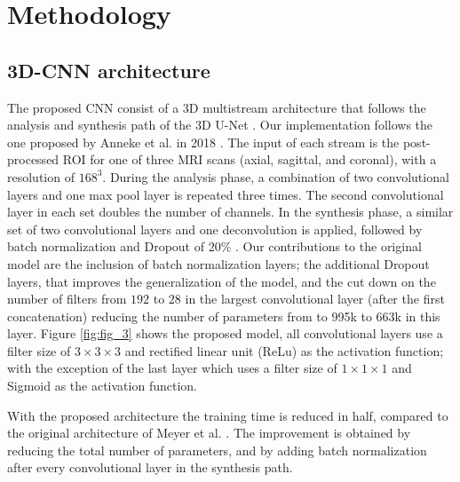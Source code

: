 \section{Methodology}
\label{sec:methods}




\subsection{3D-CNN architecture}
The proposed CNN consist of a 3D multistream architecture that follows the analysis and synthesis path of the 3D U-Net \cite{cciccek20163d}. Our implementation follows the one proposed by Anneke et al. in 2018  \cite{anneke}. The input of each stream is the post-processed ROI for one of three MRI scans (axial, sagittal, and coronal), with a resolution of $168^3$. During the analysis phase, a combination of two convolutional layers and one max pool layer is repeated three times. The second convolutional layer in each set doubles the number of channels.  In the synthesis phase, a similar set of two convolutional layers and one deconvolution is applied, followed by batch normalization and Dropout of 20\% \cite{hinton2012improving}. Our contributions
to the original model are the inclusion of batch normalization layers; the additional Dropout layers, that improves the generalization of the model, and the cut down on the number of filters from $192$ to $28$ in the largest convolutional layer (after the first concatenation) reducing the number of parameters from to 995k to 663k in this layer. Figure \ref{fig:fig_3} shows the proposed model, all convolutional layers use a filter size of $3 \times 3 \times 3$ and rectified linear unit (ReLu) as the activation function; with the exception of the last layer which uses a filter size of $1 \times 1 \times 1$ and Sigmoid as the activation function. 

With the proposed architecture the training time is reduced in half, compared to the original architecture of Meyer et al. \cite{anneke}. The improvement is obtained by reducing the total number of parameters, and by adding batch normalization after every convolutional layer in the synthesis path.

